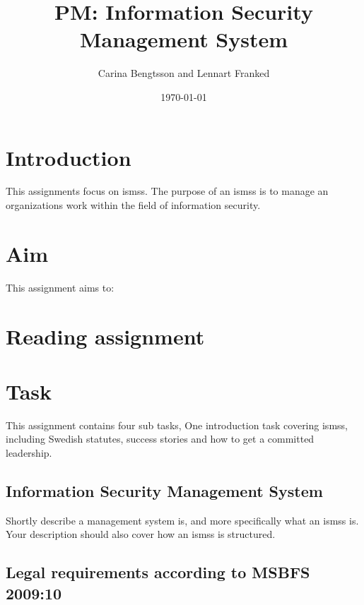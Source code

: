 \documentclass[a4paper]{llncs}
\begin{document}
\title{PM\@: Information Security Management System}
\author{%
  Carina Bengtsson and Lennart Franked
}
\date{\today}

\maketitle


\section{Introduction}
\label{sec:introduction}

This assignments focus on \acp{isms}. The purpose of an \acp{isms} is to manage
an organizations work within the field of information security.

\section{Aim}
\label{sec:aim}

This assignment aims to:
\begin{itemize}
  
\end{itemize}


\section{Reading assignment}




\section{Task}\label{Work}

This assignment contains four sub tasks, One introduction task covering
\acp{isms}, including Swedish statutes, success stories and how to get a
committed leadership.

\subsection{Information Security Management System}
Shortly describe a management system is, and more specifically what an
\acp{isms} is. Your description should also cover how an \acp{isms} is
structured.

\subsection{Legal requirements according to MSBFS 2009:10}
\end{document}
